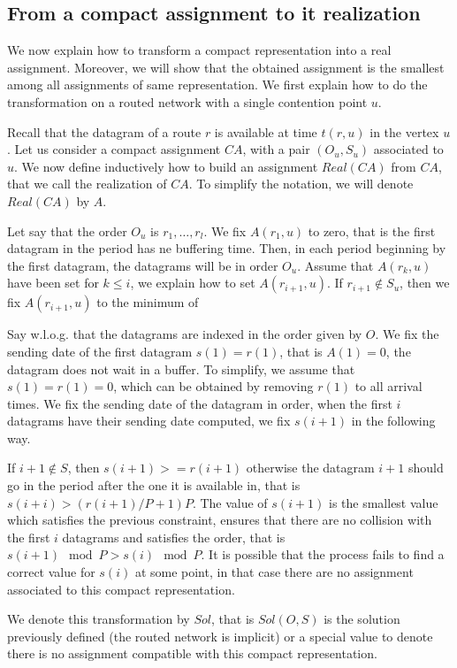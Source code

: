 \documentclass[english]{article}
\begin{document}
\subsection{From a compact assignment to it realization}



We now explain how to transform a compact representation into a real assignment.
Moreover, we will show that the obtained assignment is the smallest among all assignments of same representation. We first explain how to do the transformation on a routed network with a single contention point $u$.

Recall that the datagram of a route $r$ is available at time $t(r,u)$ in the vertex $u$.
Let us consider a compact assignment $CA$, with a pair $(O_u,S_u)$ associated to $u$.
We now define inductively how to build an assignment $Real(CA)$ from $CA$, that we call the realization of $CA$. To simplify the notation, we will denote $Real(CA)$ by $A$.

Let say that the order $O_u$ is $r_1, \dots, r_l$. We fix $A(r_1,u)$ to zero, that is the first
datagram in the period has ne buffering time. Then, in each period beginning by the first datagram, the datagrams will be in order $O_u$. 
Assume that $A(r_k,u)$ have been set for $k \leq i$, we explain how to 
set $A(r_{i+1},u)$. If $r_{i+1} \notin S_u$, then we fix $A(r_{i+1},u)$ to the minimum
of 


Say w.l.o.g. that the datagrams are indexed in the order given by $O$.
We fix the sending date of the first datagram $s(1) = r(1)$, that is $A(1) = 0$, the datagram does not wait in a buffer.  To simplify, we assume that $s(1) = r(1) = 0$, which can be obtained by removing $r(1)$ to all arrival times. We fix the sending date of the datagram in order, when the first $i$ datagrams have their sending date computed, we fix $s(i+1)$ in the following way. 

If $i+1 \notin S$, then $s(i+1) >= r(i+1)$ otherwise the datagram $i+1$ should go in the period after the one it is available in, that is $s(i+i) > (r(i+1)/P + 1)P$.
The value of  $s(i+1)$ is the smallest value which satisfies the previous constraint,
ensures that there are no collision with the first $i$ datagrams and  satisfies the order, that is $s(i+1) \mod P > s(i) \mod P$. 
It is possible that the process fails to find a correct value for $s(i)$ at some point,
in that case there are no assignment associated to this compact representation.

We denote this transformation by $Sol$, that is $Sol(O,S)$ is the solution previously defined
(the routed network is implicit) or a special value to denote there is no assignment compatible with this compact representation. 
\end{document}
